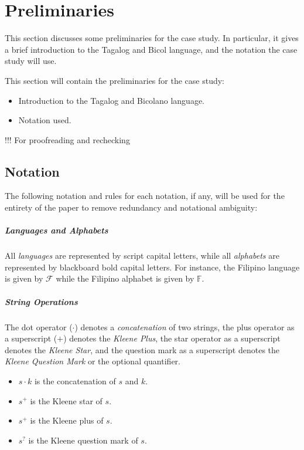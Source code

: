 \chapter{Preliminaries}
This section discusses some preliminaries for the case study. In particular, it gives a brief introduction to the Tagalog and Bicol language, and the notation the case study will use.

{\color{blue}
        This section will contain the preliminaries for the case study:

        \begin{itemize}
            \item Introduction to the Tagalog and Bicolano language.
            \item Notation used.
        \end{itemize}

        !!! For proofreading and rechecking
}

\section{Notation}
The following notation and rules for each notation, if any, will be used for the entirety of the paper to remove redundancy and notational ambiguity:

\paragraph{Languages and Alphabets}
All \emph{languages} are represented by script capital letters, while all \emph{alphabets} are represented by blackboard bold capital letters. For instance, the Filipino language is given by \(\mathcal{F}\) while the Filipino alphabet is given by \(\mathbb{F}\).

\paragraph{String Operations}
The dot operator (\(\cdot\)) denotes a \emph{concatenation} of two strings, the plus operator as a superscript (\(+\)) denotes the \emph{Kleene Plus}, the star operator as a superscript denotes the \emph{Kleene Star}, and the question mark as a superscript denotes the \emph{Kleene Question Mark} or the optional quantifier.

\begin{itemize}
    \item $s\cdot k$ is the concatenation of $s$ and $k$.
    \item $s^+$ is the Kleene star of $s$.
    \item $s^+$ is the Kleene plus of $s$.
    \item $s^?$ is the Kleene question mark of $s$.
\end{itemize}


